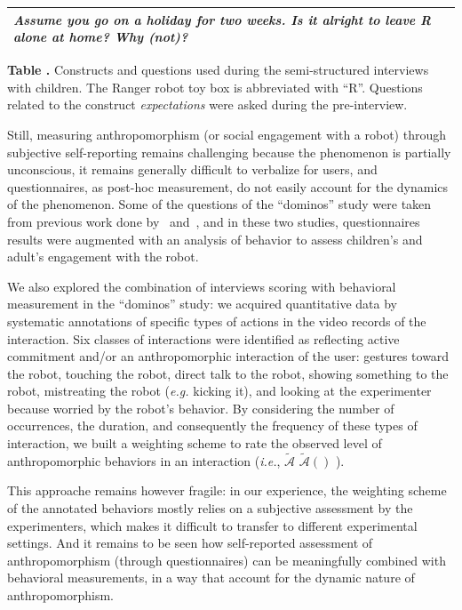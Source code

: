 \documentclass{frontiersSCNS} %
\newcommand{\eg}{\textit{e.g.}\xspace}
\newcommand{\ie}{\textit{i.e.}\xspace}
\newcommand{\AntE}[1][]{%
      \ifthenelse{\isempty{#1}}%
      {$\widetilde{\mathcal{A}}$}
      {$\widetilde{\mathcal{A}}(#1)$}
}
\begin{document}
\begin{table}
\begin{tabular}{lp{10cm}}
    \emph{Assume you go on a holiday for two weeks. Is it alright to leave R
    alone at home? Why (not)?}
    \\
    \bottomrule

    \end{tabular}

    \textbf{\label{tab:domino-questions}Table .} Constructs and questions used during the semi-structured interviews
    with children. The Ranger robot toy box is abbreviated with ``R''. Questions
    related to the construct \emph{expectations} were asked during the
    pre-interview.

\end{table}

Still, measuring anthropomorphism (or social engagement with a robot) through
subjective self-reporting remains challenging because the phenomenon is
partially unconscious, it remains generally difficult to verbalize for users,
and questionnaires, as post-hoc measurement, do not easily account for the
dynamics of the phenomenon.  Some of the questions of the ``dominos'' study were
taken from previous work done by~\cite{kahn_jr._robotic_2006}
and~\cite{weiss_i_2009}, and in these two studies, questionnaires results were
augmented with an analysis of behavior to assess children's and adult's
engagement with the robot.

We also explored the combination of interviews scoring with behavioral
measurement in the ``dominos'' study: we acquired quantitative data by
systematic annotations of specific types of actions in the video records of the
interaction. Six classes of interactions were identified as reflecting active
commitment and/or an anthropomorphic interaction of the user: gestures toward
the robot, touching the robot, direct talk to the robot, showing something to
the robot, mistreating the robot (\eg kicking it), and looking at the
experimenter because worried by the robot's behavior.
By considering the number of occurrences, the duration, and consequently the
frequency of these types of interaction, we built a weighting scheme to rate
the observed level of anthropomorphic behaviors in an interaction (\ie, \AntE).

This approache remains however fragile: in our experience, the weighting scheme
of the annotated behaviors mostly relies on a subjective assessment by the
experimenters, which makes it difficult to transfer to different experimental
settings. And it remains to be seen how self-reported assessment of
anthropomorphism (through questionnaires) can be meaningfully combined with
behavioral measurements, in a way that account for the dynamic nature of
anthropomorphism.
\end{document}

